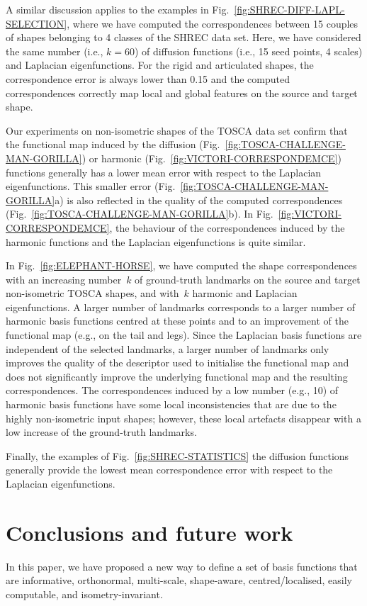 \documentclass[acmtog,authorversion]{acmart}
\begin{document}
A similar discussion applies to the examples in Fig.~\ref{fig:SHREC-DIFF-LAPL-SELECTION}, where we have computed the correspondences between 15 couples of shapes belonging to 4 classes of the SHREC data set. Here, we have considered the same number (i.e., \mbox{$k=60$}) of diffusion functions (i.e., 15 seed points, 4 scales) and Laplacian eigenfunctions. For the rigid and articulated shapes, the correspondence error is always lower than 0.15 and the computed correspondences correctly map local and global features on the source and target shape.

Our experiments on non-isometric shapes of the TOSCA data set confirm that the functional map induced by the diffusion (Fig.~\ref{fig:TOSCA-CHALLENGE-MAN-GORILLA}) or harmonic (Fig.~\ref{fig:VICTORI-CORRESPONDEMCE}) functions generally has a lower mean error with respect to the Laplacian eigenfunctions. This smaller error (Fig.~\ref{fig:TOSCA-CHALLENGE-MAN-GORILLA}a) is also reflected in the quality of the computed correspondences (Fig.~\ref{fig:TOSCA-CHALLENGE-MAN-GORILLA}b). In Fig.~\ref{fig:VICTORI-CORRESPONDEMCE}, the behaviour of the correspondences induced by the harmonic functions and the Laplacian eigenfunctions is quite similar.

In Fig.~\ref{fig:ELEPHANT-HORSE}, we have computed the shape correspondences with an increasing number~$k$ of ground-truth landmarks on the source and target non-isometric TOSCA shapes, and with~$k$ harmonic and Laplacian eigenfunctions. A larger number of landmarks corresponds to a larger number of harmonic basis functions centred at these points and to an improvement of the functional map (e.g., on the tail and legs). Since the Laplacian basis functions are independent of the selected landmarks, a larger number of landmarks only improves the quality of the descriptor used to initialise the functional map and does not significantly improve the underlying functional map and the resulting correspondences. The correspondences induced by a low number (e.g., 10) of harmonic basis functions have some local inconsistencies that are due to the highly non-isometric input shapes; however, these local artefacts disappear with a low increase of the ground-truth landmarks. 

Finally, the examples of Fig.~\ref{fig:SHREC-STATISTICS} the diffusion functions generally provide the lowest mean correspondence error with respect to the Laplacian eigenfunctions.

\section{Conclusions and future work}\label{sec:CONCLUSION}
In this paper, we have proposed a new way to define a set of basis functions that are informative, orthonormal, multi-scale, shape-aware, centred/localised, easily computable, and isometry-invariant.
\end{document}
